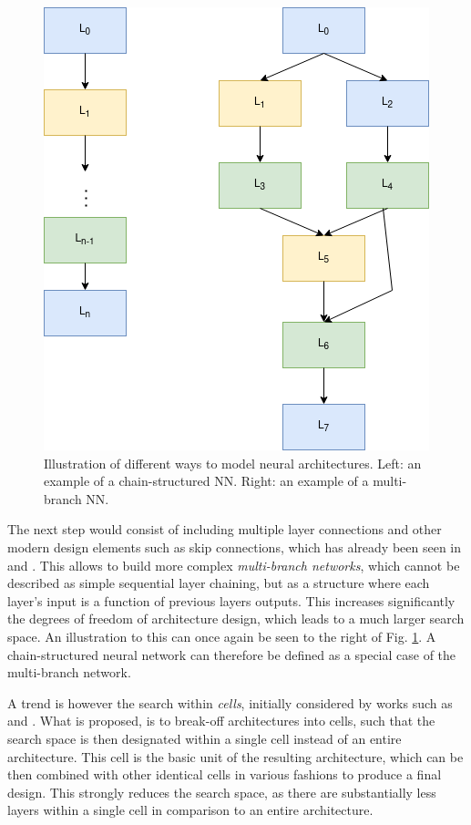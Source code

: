\documentclass[10pt,        %
               a4paper,     %
               journal,     %
               ]{IEEEtran}
\begin{document}
\begin{figure}[!h]
    \centering
    \includegraphics[scale=0.4]{space}
    \caption{Illustration of different ways to model neural architectures. Left: an example of a chain-structured NN.
             Right: an example of a multi-branch NN.}
    \label{space}
\end{figure}

The next step would consist of including multiple layer connections and other modern design elements such as skip connections, which has already been seen
in \cite{zoph2016neural} and \cite{pmlr-v70-real17a}. This allows to build more complex \textit{multi-branch networks}, which
cannot be described as simple sequential layer chaining, but as a structure where each layer's input is a function of
previous layers outputs. This increases significantly the degrees of freedom of architecture design,
which leads to a much larger search space. An illustration to this can once again be seen to the right of Fig. \ref{space}.
A chain-structured neural network can therefore be defined as a special case of the multi-branch network.

A trend is however the search within \textit{cells}, initially considered by works such as
\cite{zhong2018practical} and \cite{zoph2018learning}. What is proposed, is to break-off architectures into cells, such that
the search space is then designated within a single cell instead of an entire architecture. This cell is the basic unit of the
resulting architecture, which can be then combined with other identical cells in various fashions to produce a final design.
This strongly reduces the search space, as there are substantially less layers within a single cell in comparison to
an entire architecture.
\end{document}
